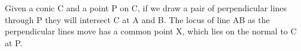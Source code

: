  Given a conic C and a point P on C, if we draw a pair of perpendicular
lines through P they will intersect C at A and B. The locus of line
AB as the perpendicular lines move has a common point X, which
lies on the normal to C at P.
